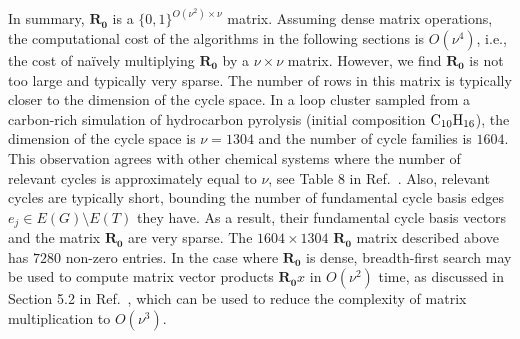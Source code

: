 \documentclass[fleqn,11pt]{article}
\begin{document}
In summary, $\bm{R_0}$ is a $\{0,1\}^{O(\nu^2)\times\nu}$ matrix. 
Assuming dense matrix operations, the computational cost of the algorithms in the following sections is $O(\nu^4)$, i.e., the cost of na\"ively multiplying $\bm{R_0}$ by a $\nu\times\nu$ matrix.
However, we find $\bm{R_0}$ is not too large and typically very sparse. 
The number of rows in this matrix is typically closer to the dimension of the cycle space. 
In a loop cluster sampled from a carbon-rich simulation of hydrocarbon pyrolysis (initial composition $\rm C_{10}H_{16}$), the dimension of the cycle space is $\nu=1304$ and the number of cycle families is $1604$.
This observation agrees with other chemical systems where the number of relevant cycles is approximately equal to $\nu$, see Table 8 in Ref.~\cite{mayEfficient2014}.
Also, relevant cycles are typically short, bounding the number of fundamental cycle basis edges $e_j\in E(G)\setminus E(T)$ they have. 
As a result, their fundamental cycle basis vectors and the matrix $\bm{R_0}$ are very sparse. The $1604\times 1304$ $\bm{R_0}$ matrix described above has $7280$ non-zero entries. 
In the case where $\bm{R_0}$ is dense, breadth-first search may be used to compute matrix vector products $\bm{R_0}x$ in $O(\nu^2)$ time, as discussed in Section 5.2 in Ref.~\cite{mehlhornMinimum2010}, which can be used to reduce the complexity of matrix multiplication to $O(\nu^3)$. 
\end{document}
